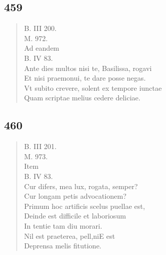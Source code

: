 \documentclass[11pt, a4paper]{report}
\begin{document}
            \subsection*{459}
      \begin{verse}
      B. III 200. \\ M. 972. \\  \lbrack Ad eandem \rbrack  \\ B. IV 83. \\ Ante dies multos nisi te, Basilissa, rogavi \\ Et nisi praemonui, te dare posse negas. \\ Vt subito crevere, solent ex tempore iunctae \\ Quam scriptae melius cedere deliciae. \\ 
      \end{verse}
  
            \subsection*{460}
      \begin{verse}
      B. III 201. \\ M. 973. \\  \lbrack Item \rbrack  \\ B. IV 83. \\ Cur difers, mea lux, rogata, semper? \\ Cur longam petis advocationem? \\ Primum hoc artificis scelus puellae est, \\ Deinde est difficile et laboriosum \\ In tentie tam diu morari. \\ Nil est praeterea, pell,niE est \\ Deprensa melis fitutione. \\ 
      \end{verse}
  
\end{document}

